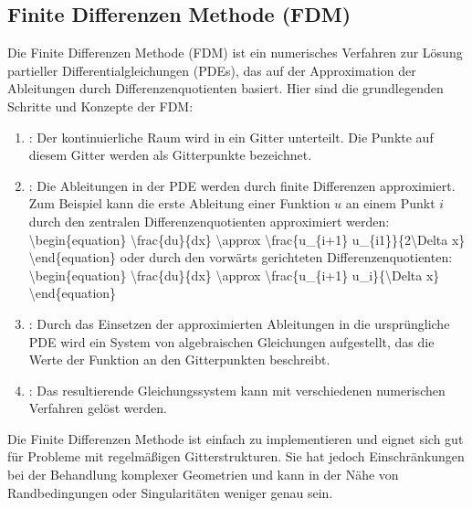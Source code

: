 \documentclass[letterpaper,10pt,german]{jupyterBook}
\begin{document}
\subsection{Finite Differenzen Methode (FDM)}
\label{\detokenize{chapters/chapter1/Einf_xfchrung_Loesungsverfahren:finite-differenzen-methode-fdm}}
\sphinxAtStartPar
Die Finite Differenzen Methode (FDM) ist ein numerisches Verfahren zur Lösung partieller Differentialgleichungen (PDEs), das auf der Approximation der Ableitungen durch Differenzenquotienten basiert. Hier sind die grundlegenden Schritte und Konzepte der FDM:
\begin{enumerate}
%
\item {} 
\sphinxAtStartPar
{}: Der kontinuierliche Raum wird in ein Gitter unterteilt. Die Punkte auf diesem Gitter werden als Gitterpunkte bezeichnet.

\item {} 
\sphinxAtStartPar
{}: Die Ableitungen in der PDE werden durch finite Differenzen approximiert. Zum Beispiel kann die erste Ableitung einer Funktion \(u\) an einem Punkt \(i\) durch den zentralen Differenzenquotienten approximiert werden:
\textbackslash{}begin\{equation\}
\textbackslash{}frac\{du\}\{dx\} \textbackslash{}approx \textbackslash{}frac\{u\_\{i+1\} \sphinxhyphen{} u\_\{i\sphinxhyphen{}1\}\}\{2\textbackslash{}Delta x\}
\textbackslash{}end\{equation\}
oder durch den vorwärts gerichteten Differenzenquotienten:
\textbackslash{}begin\{equation\}
\textbackslash{}frac\{du\}\{dx\} \textbackslash{}approx \textbackslash{}frac\{u\_\{i+1\} \sphinxhyphen{} u\_i\}\{\textbackslash{}Delta x\}
\textbackslash{}end\{equation\}

\item {} 
\sphinxAtStartPar
{}: Durch das Einsetzen der approximierten Ableitungen in die ursprüngliche PDE wird ein System von algebraischen Gleichungen aufgestellt, das die Werte der Funktion an den Gitterpunkten beschreibt.

\item {} 
\sphinxAtStartPar
{}: Das resultierende Gleichungssystem kann mit verschiedenen numerischen Verfahren gelöst werden.

\end{enumerate}

\sphinxAtStartPar
Die Finite Differenzen Methode ist einfach zu implementieren und eignet sich gut für Probleme mit regelmäßigen Gitterstrukturen. Sie hat jedoch Einschränkungen bei der Behandlung komplexer Geometrien und kann in der Nähe von Randbedingungen oder Singularitäten weniger genau sein.
\end{document}

